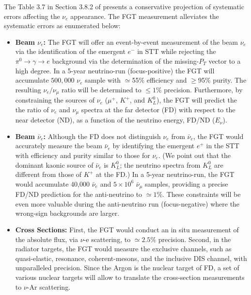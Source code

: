 The Table 3.7 
in Section 3.8.2 of \volphys
presents a conservative projection of systematic errors affecting the
$\nu_e$ appearance. The FGT measurement alleviates the systematic
errors as enumerated below:
\begin{itemize}
    \item {\bf Beam $\nu_e$:} The FGT will offer an event-by-event
      measurement of the beam $\nu_e$ via the identification of the
      emergent $e^-$ in STT while rejecting the $\pi^0 \rightarrow
      \gamma \rightarrow e$ background via the determination of the
      missing-$P_T$ vector to a high degree.  In a 5-year neutrino-run
      (focus-positive) the FGT will accumulate $500,000$ $\nu_e$
      sample with $\simeq$55\% efficiency and $\geq$95\% purity.
      The resulting $\nu_e / \nu_\mu$ ratio will be determined to
      $\leq 1\%$ precision. Furthermore, by constraining the sources
      of $\nu_e$ ($\mu^+$, $K^+$, and $K^0_L$), the FGT will predict
      the the ratio of $\nu_e$ and $\nu_\mu$ spectra at the far
      detector (FD) with respect to the near detector (ND), as a
      function of the neutrino energy, FD/ND ($E_\nu$).

    \item {\bf Beam $\bar\nu_e$:} Although the FD does not distinguish
      $\nu_e$ from $\bar\nu_e$, the FGT would accurately measure the
      beam $\bar\nu_e$ by identifying the emergent $e^+$ in the STT
      with efficiency and purity similar to those for $\nu_e$.  (We
      point out that the dominant kaonic source of $\bar\nu_e$ is
      $K^0_L$; the neutrino spectra from $K^0_L$ are different from
      those of $K^+$ at the FD.)  In a 5-year neutrino-run, the FGT
      would accumulate 40,000 $\bar\nu_e$ and $5\times 10^6$
      $\bar\nu_\mu$ samples, providing a precise FD/ND prediction for
      the anti-neutrino to $\simeq 1\%$.  These constraints will be
      even more valuable during the anti-neutrino run (focus-negative)
      where the wrong-sign backgrounds are larger.

    \item {\bf Cross Sections:} First, the FGT would conduct an in
      situ measurement of the absolute flux, via $\nu$-e scattering,
      to $\simeq 2.5\%$ precision. Second, in the radiator targets,
      the FGT would measure the exclusive channels, such as
      quasi-elastic, resonance, coherent-mesons, and the inclusive DIS
      channel, with unparalleled precision. Since the Argon is the
      nuclear target of FD, a set of various nuclear targets will
      allow to translate the cross-section measurements to $\nu$-Ar
      scattering.


\end{itemize}
